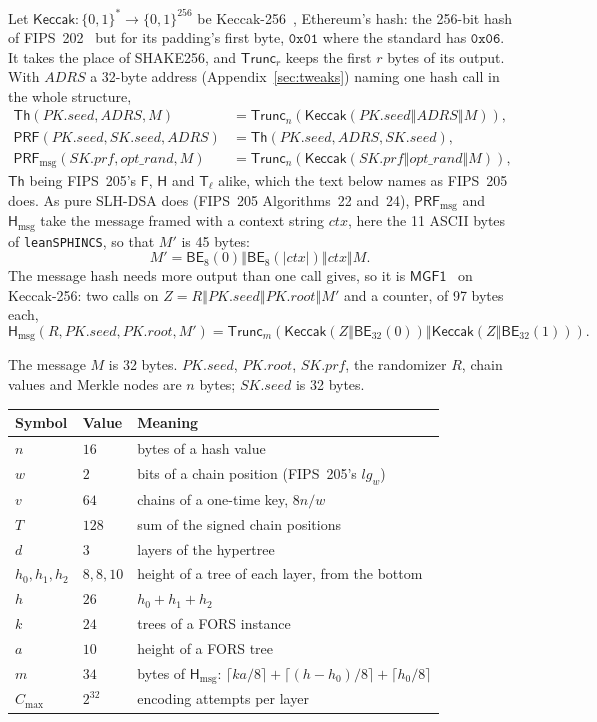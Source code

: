 \documentclass[11pt]{article}
\newcommand{\bits}[1]{\{0,1\}^{#1}}
\newcommand{\keccak}{\mathsf{Keccak}}
\newcommand{\Th}{\mathsf{Th}}
\newcommand{\PRF}{\mathsf{PRF}}
\newcommand{\PRFmsg}{\mathsf{PRF}_{\mathrm{msg}}}
\newcommand{\Hmsg}{\mathsf{H}_{\mathrm{msg}}}
\newcommand{\BE}{\mathsf{BE}}
\newcommand{\Truncate}{\mathsf{Trunc}}
\newcommand{\concat}{\mathbin\Vert}
\newcommand{\pkseed}{\mathit{PK.seed}}
\newcommand{\pkroot}{\mathit{PK.root}}
\newcommand{\skseed}{\mathit{SK.seed}}
\newcommand{\skprf}{\mathit{SK.prf}}
\newcommand{\addr}{\mathit{ADRS}}
\newcommand{\cmax}{C_{\max}}
\begin{document}
Let $\keccak:\bits{*}\to\bits{256}$ be Keccak-256~\cite{keccak}, Ethereum's hash: the 256-bit hash of FIPS~202~\cite{fips202} but for its padding's first byte, $\mathtt{0x01}$ where the standard has $\mathtt{0x06}$. It takes the place of SHAKE256, and $\Truncate_r$ keeps the first $r$ bytes of its output. With $\addr$ a 32-byte address (Appendix~\ref{sec:tweaks}) naming one hash call in the whole structure,
\[
\begin{aligned}
  \Th(\pkseed,\addr,M)&=\Truncate_n\!\left(\keccak(\pkseed\concat\addr\concat M)\right),\\
  \PRF(\pkseed,\skseed,\addr)&=\Th(\pkseed,\addr,\skseed),\\
  \PRFmsg(\skprf,\mathit{opt\_rand},M)&=\Truncate_n\!\left(\keccak(\skprf\concat\mathit{opt\_rand}\concat M)\right),
\end{aligned}
\]
$\Th$ being FIPS~205's $\mathsf F$, $\mathsf H$ and $\mathsf T_\ell$ alike, which the text below names as FIPS~205 does. As pure SLH-DSA does (FIPS~205 Algorithms~22 and~24), $\PRFmsg$ and $\Hmsg$ take the message framed with a context string $\mathit{ctx}$, here the 11 ASCII bytes of \texttt{leanSPHINCS}, so that $M'$ is 45 bytes:
\[
  M'=\BE_8(0)\concat\BE_8(|\mathit{ctx}|)\concat\mathit{ctx}\concat M.
\]
The message hash needs more output than one call gives, so it is $\mathsf{MGF1}$~\cite{RFC8017} on Keccak-256: two calls on $Z=R\concat\pkseed\concat\pkroot\concat M'$ and a counter, of 97 bytes each,
\[
  \Hmsg(R,\pkseed,\pkroot,M')=\Truncate_m\!\left(\keccak(Z\concat\BE_{32}(0))\concat\keccak(Z\concat\BE_{32}(1))\right).
\]

The message $M$ is 32 bytes. $\pkseed$, $\pkroot$, $\skprf$, the randomizer $R$, chain values and Merkle nodes are $n$ bytes; $\skseed$ is 32 bytes.

\begin{center}
\begin{tabular}{@{}lll@{}}
\toprule
Symbol & Value & Meaning\\
\midrule
$n$ & $16$ & bytes of a hash value\\
$w$ & $2$ & bits of a chain position (FIPS~205's $\mathit{lg}_w$)\\
$v$ & $64$ & chains of a one-time key, $8n/w$\\
$T$ & $128$ & sum of the signed chain positions\\
$d$ & $3$ & layers of the hypertree\\
$h_0,h_1,h_2$ & $8,8,10$ & height of a tree of each layer, from the bottom\\
$h$ & $26$ & $h_0+h_1+h_2$\\
$k$ & $24$ & trees of a FORS instance\\
$a$ & $10$ & height of a FORS tree\\
$m$ & $34$ & bytes of $\Hmsg$: $\lceil ka/8\rceil+\lceil(h-h_0)/8\rceil+\lceil h_0/8\rceil$\\
$\cmax$ & $2^{32}$ & encoding attempts per layer\\
\bottomrule
\end{tabular}
\end{center}
\end{document}
